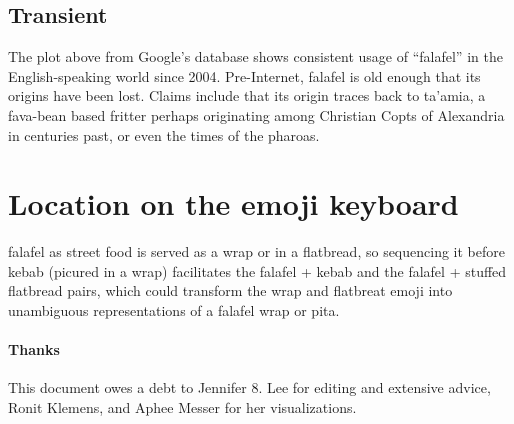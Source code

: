 \documentclass[a4paper,10pt]{article}
\begin{document}
\subsection{Transient}

The plot above from Google's database shows consistent usage of ``falafel'' in the
English-speaking world since 2004. Pre-Internet, falafel is old enough that its origins
have been lost. Claims include that its origin traces back to ta'amia, a fava-bean
based fritter perhaps originating among Christian Copts of Alexandria in centuries past,
or even the times of the pharoas.


\section{Location on the emoji keyboard}

{\sc falafel} as street food is served as a wrap or in a flatbread, so sequencing it before {\sc kebab}
(picured in a wrap) facilitates the {\sc falafel} + {\sc kebab} and the {\sc falafel}
+ {\sc stuffed flatbread} pairs, which could transform the wrap and flatbreat emoji
into unambiguous representations of a falafel wrap or pita.

\vfill
\paragraph{Thanks} This document owes a debt to Jennifer 8. Lee for editing and extensive
advice, Ronit Klemens, and Aphee Messer for her visualizations.
\end{document}
